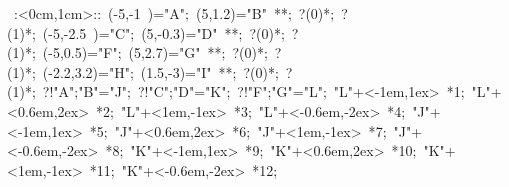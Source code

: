 %


\hbox{
\xy    <1cm,0cm>:<0cm,1cm>::
       (-5,-1 )="A"; (5,1.2)="B" **\dir{-}; ?(0)*\dir{<}; ?(1)*\dir{>};
       (-5,-2.5 )="C"; (5,-0.3)="D" **\dir{-}; ?(0)*\dir{<}; ?(1)*\dir{>}; 
       (-5,0.5)="F"; (5,2.7)="G" **\dir{-}; ?(0)*\dir{<}; ?(1)*\dir{>};
       (-2.2,3.2)="H"; (1.5,-3)="I" **\dir{-}; ?(0)*\dir{<}; ?(1)*\dir{>};
        ?!{"A";"B"}="J";  ?!{"C";"D"}="K";  ?!{"F";"G"}="L";
       "L"+<-1em,1ex> *{1};
       "L"+<0.6em,2ex> *{2};
       "L"+<1em,-1ex> *{3};
       "L"+<-0.6em,-2ex> *{4};
       "J"+<-1em,1ex> *{5};
       "J"+<0.6em,2ex> *{6};
       "J"+<1em,-1ex> *{7};
       "J"+<-0.6em,-2ex> *{8};
       "K"+<-1em,1ex> *{9};
       "K"+<0.6em,2ex> *{10};
       "K"+<1em,-1ex> *{11};
       "K"+<-0.6em,-2ex> *{12};
\endxy}

